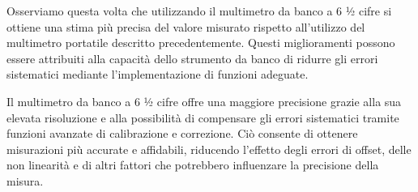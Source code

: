 \begin{table}[!ht]
    \caption{Multimetro 34401A (6$\sfrac{1}{2}$ cifre), 4 Morsetti}
    \label{tab:mult_4w}
\end{table}
\FloatBarrier



Osserviamo questa volta che utilizzando il multimetro da banco a 6 ½ cifre si ottiene una stima più precisa del valore misurato rispetto all'utilizzo del multimetro portatile descritto precedentemente. Questi miglioramenti possono essere attribuiti alla capacità dello strumento da banco di ridurre gli errori sistematici mediante l'implementazione di funzioni adeguate.

Il multimetro da banco a 6 ½ cifre offre una maggiore precisione grazie alla sua elevata risoluzione e alla possibilità di compensare gli errori sistematici tramite funzioni avanzate di calibrazione e correzione. Ciò consente di ottenere misurazioni più accurate e affidabili, riducendo l'effetto degli errori di offset, delle non linearità e di altri fattori che potrebbero influenzare la precisione della misura.

